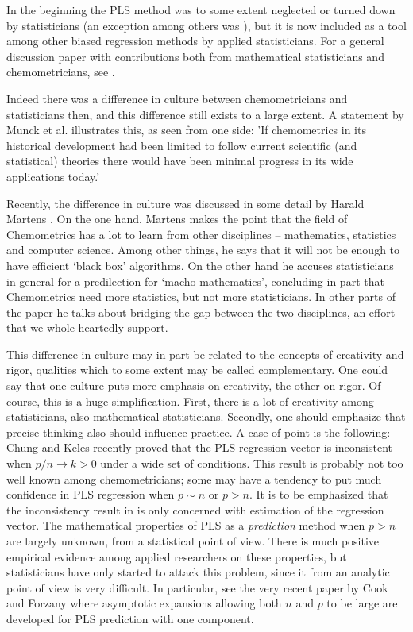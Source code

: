 \documentclass[num-refs]{wiley-article}
\begin{document}
In the beginning the PLS method was to some extent neglected or turned down by statisticians (an exception among others was \citealp{frank1993statistical}), but it is now included as a tool among other biased regression methods by applied statisticians. For a general discussion paper with contributions both from mathematical statisticians and chemometricians, see \citet{sundberg1999multivariate}.

Indeed there was a difference in culture between chemometricians and statisticians then, and this difference still exists to a large extent. A statement by Munck et al.  \citet{munck2010physiochemical} illustrates this, as seen from one side: 'If chemometrics in its historical development had been limited to follow current scientific (and statistical) theories there would have been minimal progress in its wide applications today.'

Recently, the difference in culture was discussed in some detail by Harald Martens \citet{martens2015bigdata}. On the one hand, Martens makes the point that the field of Chemometrics has a lot to learn from other disciplines -- mathematics, statistics and computer science. Among other things, he says that it will not be enough to have efficient `black box' algorithms. On the other hand he accuses statisticians in general for a predilection for `macho mathematics', concluding in part that Chemometrics need more statistics, but not more statisticians. In other parts of the paper he talks about bridging the gap between the two disciplines, an effort that we whole-heartedly support.

This difference in culture may in part be related to the concepts of creativity and rigor, qualities which to some extent may be called complementary. One could say that one culture puts more emphasis on creativity, the other on rigor. Of course, this is a huge simplification. First, there is a lot of creativity among statisticians, also mathematical statisticians. Secondly, one should emphasize that precise thinking also should influence practice. A case of point is the following:  Chung and Keles \citet{chung2010sparse} recently proved that the PLS regression vector is inconsistent when $p/n\rightarrow k>0$ under a wide set of conditions. This result is probably not too well known among chemometricians; some may have a tendency to put much confidence in PLS regression when $p\sim n$ or $p>n$. It is to be emphasized that the inconsistency result in \citet{chung2010sparse} is only concerned with estimation of the regression vector. The mathematical properties of PLS as a \emph{prediction} method when $p>n$ are largely unknown, from a statistical point of view. There is much positive empirical evidence among applied researchers on these properties, but statisticians have only started to attack this problem, since it from an analytic point of view is very difficult. In particular, see the very recent paper by Cook and Forzany \citet{cook2017pls} where asymptotic expansions allowing both $n$ and $p$ to be large are developed for PLS prediction with one component.
\end{document}
